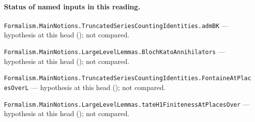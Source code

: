 

\paragraph{Status of named inputs in this reading.}
\noindent\nolinkurl{Formalism.MainNotions.TruncatedSeriesCountingIdentities.admBK} --- hypothesis at this head (); not compared.\par
\noindent\nolinkurl{Formalism.MainNotions.LargeLevelLemmas.BlochKatoAnnihilators} --- hypothesis at this head (); not compared.\par
\noindent\nolinkurl{Formalism.MainNotions.TruncatedSeriesCountingIdentities.FontaineAtPlacesOverL} --- hypothesis at this head (); not compared.\par
\noindent\nolinkurl{Formalism.MainNotions.LargeLevelLemmas.tateH1FinitenessAtPlacesOver} --- hypothesis at this head (); not compared.\par

